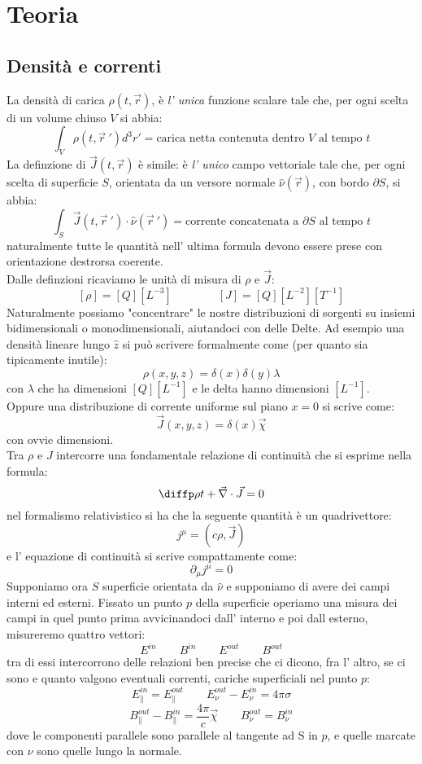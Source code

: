 \documentclass[a4paper,10pt,oneside]{math_article}
\renewcommand{\div}{\vec{\nabla} \cdot}
\begin{document}
	\section{Teoria}
	\subsection{Densità e correnti}
	La densità di carica $\rho(t,\vec r)$, è {\it l' unica} funzione scalare tale che, per ogni scelta di un volume chiuso $V$ si abbia:
	$$
	\int_V  \rho(t,\vec{r}\ ') d^3r'=\mbox{carica netta contenuta dentro $V$ al tempo $t$}
	$$
	La definzione di $\vec J(t,\vec r)$ è simile: è {\it l' unico} campo vettoriale tale che, per ogni scelta di superficie $S$, orientata da un versore normale $\hat \nu(\vec r)$, con bordo $\partial S$, si abbia:
	$$
	\int_S \vec J(t,\vec{r}\ ')\cdot \hat\nu(\vec{r}\ ')=\mbox{corrente concatenata a $\partial S$ al tempo $t$}
	$$
	naturalmente tutte le quantità nell' ultima formula devono essere prese con orientazione destrorsa coerente.\\
	Dalle definzioni ricaviamo le unità di misura di $\rho$ e $\vec J$:
	$$
	[\rho]=[Q][L^{-3}]\qquad \qquad [J]=[Q][L^{-2}][T^{-1}]
	$$
	Naturalmente possiamo "concentrare" le nostre distribuzioni di sorgenti su insiemi bidimensionali o monodimensionali, aiutandoci con delle Delte. Ad esempio una densità lineare lungo $\hat z$ si può scrivere formalmente come (per quanto sia tipicamente inutile):
	$$
	\rho(x,y,z)=\delta(x)\delta(y)\lambda
	$$
	con $\lambda$ che ha dimensioni $[Q][L^{-1}]$ e le delta hanno dimensioni $[L^{-1}]$.\\
	Oppure una distribuzione di corrente uniforme sul piano $x=0$ si scrive come:
	$$
	\vec J(x,y,z)=\delta(x)\vec\chi
	$$
	con ovvie dimensioni.\\
	Tra $\rho$ e $J$ intercorre una fondamentale relazione di continuità che si esprime nella formula:
	$$
	\diffp \rho t +\div \vec J=0\label{eq:continuita}
	$$
	nel formalismo relativistico si ha che la seguente quantità è un quadrivettore:
	$$
	j^\mu=\left(c\rho,\vec J\right)
	$$
	e l' equazione di continuità si scrive compattamente come:
	$$
	\partial_\mu j^\mu=0
	$$
	Supponiamo ora $S$ superficie orientata da $\hat\nu$ e supponiamo di avere dei campi interni ed esterni. Fissato un punto $p$ della superficie operiamo una misura dei campi in quel punto prima avvicinandoci dall' interno e poi dall esterno, misureremo quattro vettori:
	$$
	E^{in}\qquad B^{in}\qquad E^{out}\qquad B^{out}
	$$
	tra di essi intercorrono delle relazioni ben precise che ci dicono, fra l' altro, se ci sono e quanto valgono eventuali correnti, cariche superficiali nel punto $p$:
	$$
	E^{in}_\parallel=E^{out}_\parallel\qquad E^{out}_\nu-E^{in}_\nu=4\pi \sigma
	$$
	$$
	B^{out}_\parallel-B^{in}_\parallel=\frac{4\pi}{c}\vec\chi\qquad B^{out}_\nu=B^{in}_\nu
	$$
	dove le componenti parallele sono parallele al tangente ad S in $p$, e quelle marcate con $\nu$ sono quelle lungo la normale.
\end{document}
